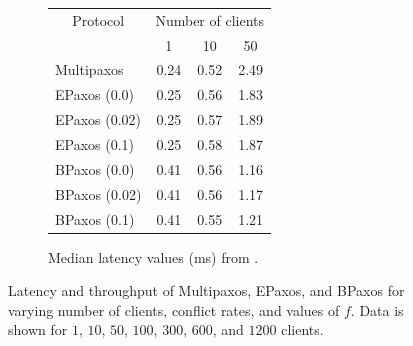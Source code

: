\begin{figure}[ht]
  \begin{subfigure}[c]{0.23\textwidth}
    \centering
    \small
    \begin{tabular}{lccc}
      \toprule
      \multicolumn{1}{c}{Protocol} &
      \multicolumn{3}{c}{Number of clients} \\
                    & 1    & 10   & 50 \\\midrule
      Multipaxos    & 0.24 & 0.52 & 2.49 \\
      EPaxos (0.0)  & 0.25 & 0.56 & 1.83 \\
      EPaxos (0.02) & 0.25 & 0.57 & 1.89 \\
      EPaxos (0.1)  & 0.25 & 0.58 & 1.87 \\
      BPaxos (0.0)  & 0.41 & 0.56 & 1.16 \\
      BPaxos (0.02) & 0.41 & 0.56 & 1.17 \\
      BPaxos (0.1)  & 0.41 & 0.55 & 1.21 \\
      \bottomrule
    \end{tabular}
    \caption{%
      Median latency values (ms) from .
    }
  \end{subfigure}
  \caption{%
    Latency and throughput of Multipaxos, EPaxos, and BPaxos for varying number
    of clients, conflict rates, and values of $f$. Data is shown for $1$, $10$,
    $50$, $100$, $300$, $600$, and $1200$ clients.
  }
\end{figure}
